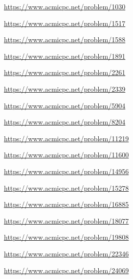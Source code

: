 \begin{problem} \url{https://www.acmicpc.net/problem/1030} \end{problem}
\begin{problem} \url{https://www.acmicpc.net/problem/1517} \end{problem}
\begin{problem} \url{https://www.acmicpc.net/problem/1588} \end{problem}
\begin{problem} \url{https://www.acmicpc.net/problem/1891} \end{problem}
\begin{problem} \url{https://www.acmicpc.net/problem/2261} \end{problem}
\begin{problem} \url{https://www.acmicpc.net/problem/2339} \end{problem}
\begin{problem} \url{https://www.acmicpc.net/problem/5904} \end{problem}
\begin{problem} \url{https://www.acmicpc.net/problem/8204} \end{problem}
\begin{problem} \url{https://www.acmicpc.net/problem/11219} \end{problem}
\begin{problem} \url{https://www.acmicpc.net/problem/11600} \end{problem}
\begin{problem} \url{https://www.acmicpc.net/problem/14956} \end{problem}
\begin{problem} \url{https://www.acmicpc.net/problem/15278} \end{problem}
\begin{problem} \url{https://www.acmicpc.net/problem/16885} \end{problem}
\begin{problem} \url{https://www.acmicpc.net/problem/18077} \end{problem}
\begin{problem} \url{https://www.acmicpc.net/problem/19808} \end{problem}
\begin{problem} \url{https://www.acmicpc.net/problem/22346} \end{problem}
\begin{problem} \url{https://www.acmicpc.net/problem/24069} \end{problem}

